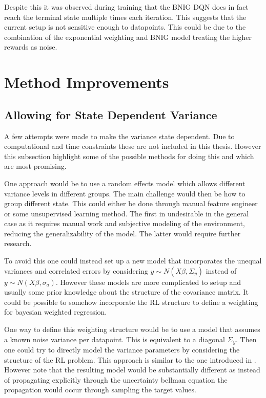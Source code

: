 Despite this it was observed during training that the BNIG DQN does in fact reach the terminal state multiple times each iteration. This suggests that the current setup is not sensitive enough to datapoints. This could be due to the combination of the exponential weighting and BNIG model treating the higher rewards as noise. 

\section{Method Improvements}

\subsection{Allowing for State Dependent Variance}

A few attempts were made to make the variance state dependent. Due to computational and time constraints these are not included in this thesis. However this subsection highlight some of the possible methods for doing this and which are most promising.

One approach would be to use a random effects model\citep[p.~382-383]{gelman_2013} which allows different variance levels in different groups. The main challenge would then be how to group different state. This could either be done through manual feature engineer or some unsupervised learning method. The first in undesirable in the general case as it requires manual work and subjective modeling of the environment, reducing the generalizability of the model. The latter would require further research.

To avoid this one could instead set up a new model that incorporates the unequal variances and correlated errors by considering $y \sim N(X\beta, \Sigma_y)$ instead of $y \sim N(X\beta, \sigma_a)$.  However these models are more complicated to setup and usually some prior knowledge about the structure of the covariance matrix. It could be possible to somehow incorporate the RL structure to define a weighting for bayesian weighted regression\citep[p.~370-373]{gelman_2013}. 

One way to define this weighting structure would be to use a model that assumes a known noise variance per datapoint. This is equivalent to a diagonal $\Sigma_y$. Then one could try to directly model the variance parameters by considering the structure of the RL problem. This approach is similar to the one introduced in \cite{donoghue_2017}. However note that the resulting model would be substantially different as instead of propagating explicitly through the uncertainty bellman equation the propagation would occur through sampling the target values.

